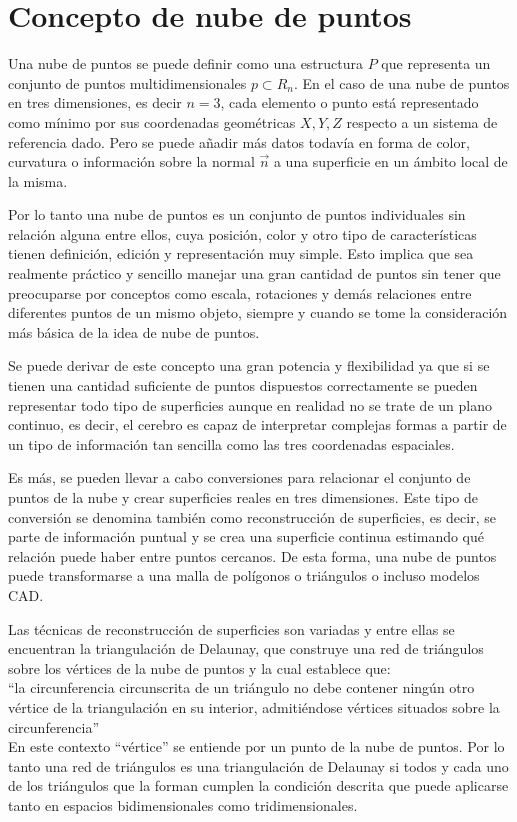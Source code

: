 \fi

\section{Concepto de nube de puntos}\label{section:nubes_ejemplo}
Una nube de puntos se puede definir como una estructura $P$ que representa un conjunto de puntos multidimensionales $p \subset R_{n}$. En el caso de una nube de puntos en tres dimensiones, es decir $n=3$, cada elemento o punto está representado como mínimo por sus coordenadas geométricas $X,Y, Z$ respecto a un sistema de referencia dado. Pero se puede añadir más datos todavía en forma de color, curvatura o información sobre la normal $\vec{n}$ a una superficie en un ámbito local de la misma.  

Por lo tanto una nube de puntos\cite{point_cloud} es un conjunto de puntos individuales sin relación alguna entre ellos, cuya
posición, color\cite{point_cloud_rgb} y otro tipo de características tienen definición, edición y representación muy simple. Esto implica que sea realmente práctico y sencillo manejar una gran cantidad de puntos sin tener que preocuparse por
conceptos como escala, rotaciones y demás relaciones entre diferentes puntos de un mismo objeto, siempre y cuando se tome la consideración más básica de la idea de nube de puntos.


Se puede derivar de este concepto una gran potencia y flexibilidad ya que si se tienen una cantidad
suficiente de puntos dispuestos correctamente se pueden representar todo tipo de superficies aunque en
realidad no se trate de un plano continuo, es decir, el cerebro es capaz de interpretar complejas formas a
partir de un tipo de información tan sencilla como las tres coordenadas espaciales.

Es más, se pueden llevar a cabo conversiones para relacionar el conjunto de puntos de la nube y crear
superficies reales en tres dimensiones. Este tipo de conversión se denomina también como reconstrucción de superficies, es decir, se parte de información puntual y se crea una superficie continua estimando qué
relación puede haber entre puntos cercanos. De esta forma, una nube de puntos puede transformarse a una
malla de polígonos o triángulos o incluso modelos CAD.

Las técnicas de reconstrucción de superficies son variadas y entre ellas se encuentran la triangulación de
Delaunay, que construye una red de triángulos sobre los vértices de la nube de puntos y la cual establece que:
\\
``la circunferencia circunscrita de un triángulo no debe contener ningún otro vértice de la triangulación en su interior, admitiéndose vértices situados sobre la circunferencia''
\\
En este contexto ``vértice'' se entiende por un punto de la nube de puntos.
Por lo tanto una red de triángulos es una triangulación de Delaunay si todos y cada uno de los triángulos que la forman cumplen la condición descrita que puede aplicarse tanto en espacios bidimensionales como tridimensionales.

